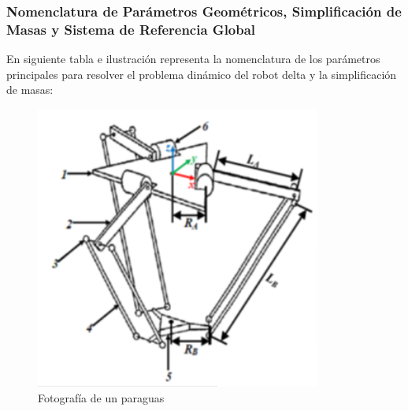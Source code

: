                 \newpage

        \subsubsection{Nomenclatura de Parámetros Geométricos, Simplificación de Masas y Sistema de Referencia Global }

        En siguiente tabla e ilustración representa la nomenclatura de los parámetros principales para resolver el problema dinámico del robot delta y la simplificación de masas:
        
        \begin{figure}[H]
              \centering
	          \includegraphics[width=0.3\linewidth]{Main/Chapter4/Images4/cap4_dina_b_1.png}
              \caption{Fotografía de un paraguas}
              \label{f:Cap4_Metodo_B_Modelacion_Dinamica_2}
        \end{figure}



